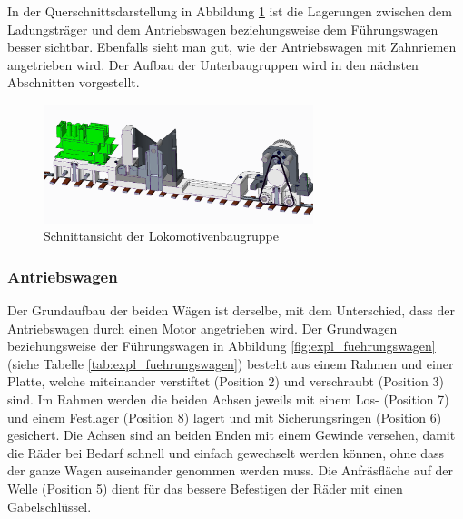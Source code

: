 \documentclass[../../main.tex]{subfiles}
\begin{document}
    In der Querschnittsdarstellung in Abbildung \ref{fig:schnitt_lokomotive} ist die Lagerungen zwischen dem Ladungsträger und dem Antriebswagen beziehungsweise dem Führungswagen besser sichtbar. Ebenfalls sieht man gut, wie der Antriebswagen mit Zahnriemen angetrieben wird. Der Aufbau der Unterbaugruppen wird in den nächsten Abschnitten vorgestellt.\\

    \begin{figure}[H] %
        \centering
        \includegraphics[width=0.7\textwidth]{lokomotive_2.png}
        \caption{Schnittansicht der Lokomotivenbaugruppe}
        \label{fig:schnitt_lokomotive}
    \end{figure}
    \newpage

    \subsubsection{Antriebswagen}
    Der Grundaufbau der beiden Wägen ist derselbe, mit dem Unterschied, dass der Antriebswagen durch einen Motor angetrieben wird. Der Grundwagen beziehungsweise der Führungswagen in Abbildung \ref{fig:expl_fuehrungswagen} (siehe Tabelle \ref{tab:expl_fuehrungswagen}) besteht aus einem Rahmen und einer Platte, welche miteinander verstiftet (Position 2) und verschraubt (Position 3) sind. Im Rahmen werden die beiden Achsen jeweils mit einem Los- (Position 7) und einem Festlager (Position 8) lagert und mit Sicherungsringen (Position 6) gesichert. Die Achsen sind an beiden Enden mit einem Gewinde versehen, damit die Räder bei Bedarf schnell und einfach gewechselt werden können, ohne dass der ganze Wagen auseinander genommen werden muss. Die Anfräsfläche auf der Welle (Position 5) dient für das bessere Befestigen der Räder mit einen Gabelschlüssel.\\
\end{document}
